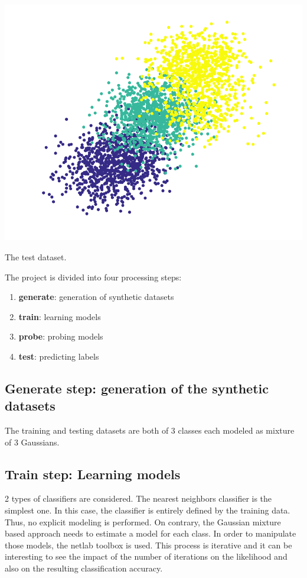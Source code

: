 \documentclass[12pt,a4paper,fleqn]{tufte-handout}
\begin{document}
\begin{marginfigure}
\includegraphics[width=\textwidth]{figures/scatter2}
\caption{The test dataset.}
\label{scatter}
\end{marginfigure}

The project is divided into four processing steps:
\begin{enumerate}
\item \textbf{generate}: generation of synthetic datasets
\item \textbf{train}: learning models
\item \textbf{probe}: probing models
\item \textbf{test}: predicting labels
\end{enumerate}

\subsection{\textbf{Generate step}: generation of the synthetic datasets}

The training and testing datasets are both of 3 classes each modeled as mixture of 3 Gaussians. 

\subsection{\textbf{Train step}: Learning models}

2 types of classifiers are considered. The nearest neighbors classifier is the simplest one. In this case, the classifier is entirely defined by the training data. Thus, no explicit modeling is performed. On contrary, the Gaussian mixture based approach needs to estimate a model for each class. In order to manipulate those models, the netlab toolbox is used. This process is iterative and it can be interesting to see the impact of the number of iterations on the likelihood and also on the resulting classification accuracy.
\end{document}
